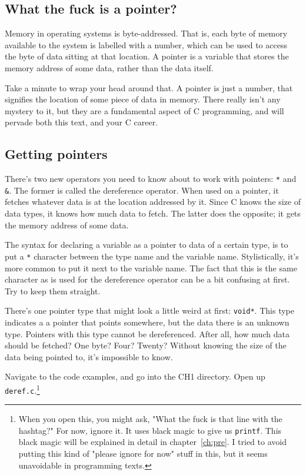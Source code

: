 \documentclass[ebook,11pt,oneside,openany]{memoir}
\begin{document}
\subsection{What the fuck is a pointer?}
\label{sec:wtf}

Memory in operating systems is byte-addressed. That is, each byte of memory available to the system is labelled with a number, which can be used to access the byte of data sitting at that location. A pointer is a variable that stores the memory address of some data, rather than the data itself. 

Take a minute to wrap your head around that. A pointer is just a number, that signifies the location of some piece of data in memory. There really isn't any mystery to it, but they are a fundamental aspect of C programming, and will pervade both this text, and your C career.

\subsection{Getting pointers}

There's two new operators you need to know about to work with pointers: \texttt{*} and \texttt{\&}. The former is called the dereference operator. When used on a pointer, it fetches whatever data is at the location addressed by it. Since C knows the size of data types, it knows how much data to fetch. The latter does the opposite; it gets the memory address of some data.

The syntax for declaring a variable as a pointer to data of a certain type, is to put a \texttt{*} character between the type name and the variable name. Stylistically, it's more common to put it next to the variable name. The fact that this is the same character as is used for the dereference operator can be a bit confusing at first. Try to keep them straight.

There's one pointer type that might look a little weird at first: \texttt{void*}. This type indicates a a pointer that points somewhere, but the data there is an unknown type. Pointers with this type cannot be dereferenced. After all, how much data should be fetched? One byte? Four? Twenty? Without knowing the size of the data being pointed to, it's impossible to know.

Navigate to the code examples, and go into the CH1 directory. Open up \texttt{deref.c}.\footnote{When you open this, you might ask, "What the fuck is that line with the hashtag?" For now, ignore it. It uses black magic to give us \texttt{printf}. This black magic will be explained in detail in chapter~\ref{ch:pre}. I tried to avoid putting this kind of "please ignore for now" stuff in this, but it seems unavoidable in programming texts.}
\end{document}
